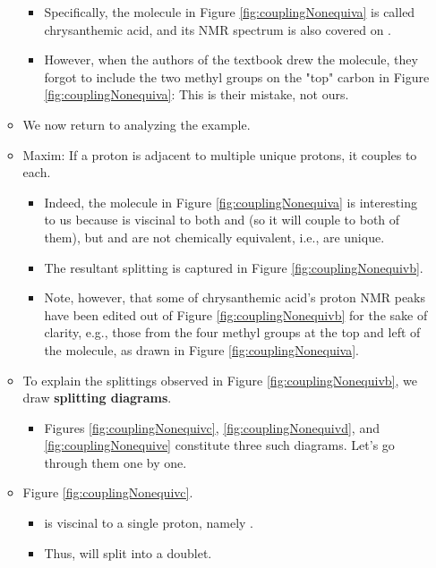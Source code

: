 \documentclass[../notes.tex]{subfiles}
\begin{document}
\begin{itemize}
\begin{itemize}
        \begin{itemize}
            \item Specifically, the molecule in Figure \ref{fig:couplingNonequiva} is called chrysanthemic acid, and its  NMR spectrum is also covered on \textcite[292]{bib:Clayden}.
            \item However, when the authors of the textbook drew the molecule, they forgot to include the two methyl groups on the "top" carbon in Figure \ref{fig:couplingNonequiva}: This is their mistake, not ours.
        \end{itemize}
        \item We now return to analyzing the example.
        \item Maxim: If a proton is adjacent to multiple unique protons, it couples to each.
        \begin{itemize}
            \item Indeed, the molecule in Figure \ref{fig:couplingNonequiva} is interesting to us because  is viscinal to both  and  (so it will couple to both of them), but  and  are not chemically equivalent, i.e., are unique.
            \item The resultant splitting is captured in Figure \ref{fig:couplingNonequivb}.
            \item Note, however, that some of chrysanthemic acid's proton NMR peaks have been edited out of Figure \ref{fig:couplingNonequivb} for the sake of clarity, e.g., those from the four methyl groups at the top and left of the molecule, as drawn in Figure \ref{fig:couplingNonequiva}.
        \end{itemize}
        \item To explain the splittings observed in Figure \ref{fig:couplingNonequivb}, we draw \textbf{splitting diagrams}.
        \begin{itemize}
            \item Figures \ref{fig:couplingNonequivc}, \ref{fig:couplingNonequivd}, and \ref{fig:couplingNonequive} constitute three such diagrams. Let's go through them one by one.
        \end{itemize}
        \item Figure \ref{fig:couplingNonequivc}.
        \begin{itemize}
            \item {} is viscinal to a single proton, namely .
            \item Thus,  will split  into a doublet.

\end{itemize}
\end{itemize}
\end{itemize}
\end{document}
